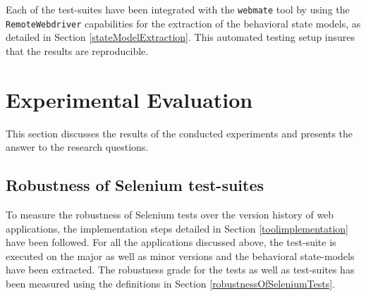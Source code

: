 Each of the test-suites have been integrated with the \texttt{webmate} tool by using the \texttt{RemoteWebdriver} capabilities for the extraction of the behavioral state models, as detailed in Section \ref{stateModelExtraction}. This automated testing setup insures that the results are reproducible. 
\begin{table}
\centering
{} 
\caption{Overview of test-suit distribution of evaluation candidates}
\label{testcandidates}
\end{table}

\section{Experimental Evaluation}
\label{expeval}
This section discusses the results of the conducted experiments and presents the answer to the research questions. 
\subsection{Robustness of Selenium test-suites}
\label{robustnessresults} 
To measure the robustness of Selenium tests over the version history of web applications, the implementation steps detailed in Section \ref{toolimplementation} have been followed. 
For all the applications discussed above, the
test-suite is executed on the major as well as minor versions and the behavioral state-models have been extracted. The robustness grade for the tests as well as test-suites has been measured using the definitions in Section \ref{robustnessOfSeleniumTests}. 


